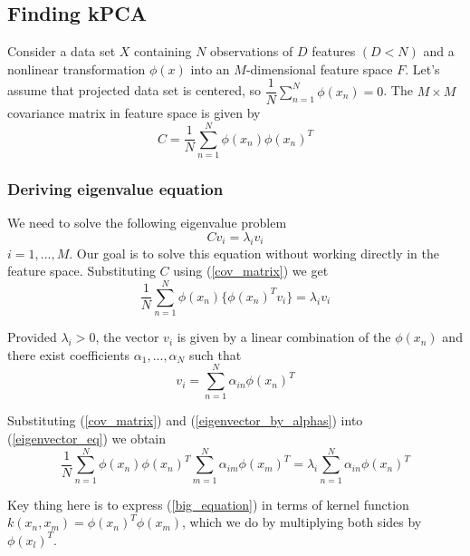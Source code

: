 \subsection{Finding kPCA}
Consider a data set $X$ containing $N$ observations of $D$ features $(D < N)$ and a nonlinear transformation $\phi(x)$ into an $M$-dimensional feature space $F$. Let's assume that projected data set is centered, so $\dfrac{1}{N}\sum_{n=1}^{N}{\phi(x_n)}=0$.
The $M \times M$ covariance matrix in feature space is given by
\begin{equation}\label{cov_matrix}
C =  \dfrac{1}{N}\sum_{n=1}^{N}{\phi(x_n)\phi(x_n)^T}
\end{equation}

\subsubsection{Deriving eigenvalue equation}
We need to solve the following eigenvalue problem
\begin{equation}\label{eigenvector_eq}
Cv_i = \lambda_i v_i
\end{equation}
$i=1,...,M$. Our goal is to solve this equation without working directly in the feature space. Substituting $C$ using (\ref{cov_matrix}) we get
\begin{equation}
\dfrac{1}{N}\sum_{n=1}^{N}{\phi(x_n)\{\phi(x_n)^Tv_i\}} = \lambda_i v_i
\end{equation}

Provided $\lambda_i > 0$, the vector $v_i$ is given by a linear combination of the $\phi(x_n)$ and there exist coefficients $\alpha_1,...,\alpha_N$ such that 
\begin{equation}\label{eigenvector_by_alphas}
v_i = \sum_{n=1}^{N}{\alpha_{in}\phi(x_n)^T}
\end{equation}

Substituting (\ref{cov_matrix}) and (\ref{eigenvector_by_alphas}) into (\ref{eigenvector_eq}) we obtain
\begin{equation}\label{big_equation}
\dfrac{1}{N}\sum_{n=1}^{N}{\phi(x_n)\phi(x_n)^T} \sum_{m=1}^{N}{\alpha_{im}\phi(x_m)^T} = \lambda_i \sum_{n=1}^{N}{\alpha_{in}\phi(x_n)^T}
\end{equation}

Key thing here is to express (\ref{big_equation}) in terms of kernel function $k(x_n, x_m) = \phi(x_n)^T\phi(x_m)$, which we do by multiplying both sides by $\phi(x_l)^T$.

